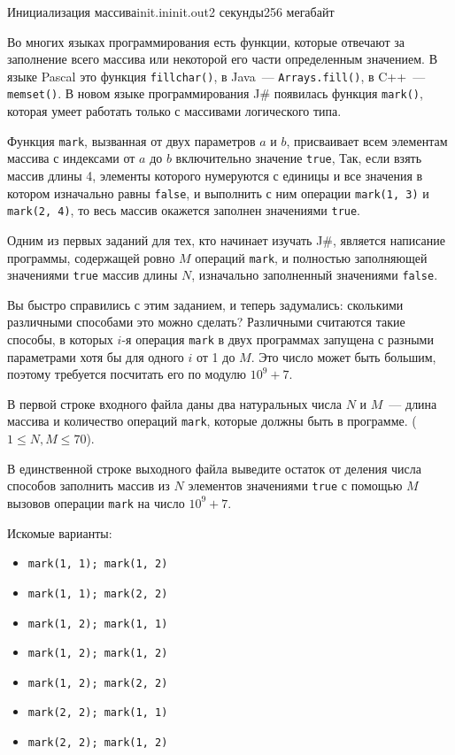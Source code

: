 \begin{problem}{Инициализация массива}{init.in}{init.out}{2 секунды}{256 мегабайт}


Во многих языках программирования есть функции, которые отвечают за заполнение всего массива или некоторой его части определенным значением. В языке 
Pascal это функция \texttt{fillchar()}, в Java~--- \texttt{Arrays.fill()}, 
в C++~--- \texttt{memset()}. В новом языке программирования J\# появилась функция \texttt{mark()}, 
которая умеет работать только с массивами логического типа.

Функция \texttt{mark}, вызванная от двух параметров $a$ и $b$, присваивает всем 
элементам массива с индексами от $a$ до $b$ включительно значение \texttt{true}, 
Так, если взять массив длины 4, элементы которого нумеруются с единицы и все значения в 
котором изначально равны \texttt{false}, и выполнить с ним операции 
\texttt{mark(1, 3)} и \texttt{mark(2, 4)}, то весь массив окажется заполнен значениями \texttt{true}.

Одним из первых заданий для тех, кто начинает изучать J\#, является написание программы, 
содержащей ровно $M$ операций \texttt{mark}, и полностью заполняющей 
значениями \texttt{true} массив длины  $N$, изначально заполненный значениями \texttt{false}. 

Вы быстро справились с этим заданием, и теперь задумались: сколькими 
различными способами это можно сделать? 
Различными считаются такие способы, в которых $i$-я операция \texttt{mark} в двух программах 
запущена с разными параметрами хотя бы для одного $i$ от 1 до $M$. Это число может 
быть большим, поэтому требуется посчитать его по модулю $10^9+7$.

\InputFile
В первой строке входного файла даны два натуральных числа $N$ и $M$~--- длина массива и количество 
операций \texttt{mark}, которые должны быть в программе.
($1 \le N, M \le 70$).

\OutputFile
В единственной строке выходного файла выведите остаток от деления числа способов заполнить
массив из $N$ элементов значениями \texttt{true} с помощью $M$ вызовов операции
\texttt{mark} на число $10^9+7$.

\Examples

\begin{example}%
%
\end{example}

\Note
Искомые варианты: 
\begin{itemize}
\item \texttt{mark(1, 1); mark(1, 2)} 
\item \texttt{mark(1, 1); mark(2, 2)} 
\item \texttt{mark(1, 2); mark(1, 1)} 
\item \texttt{mark(1, 2); mark(1, 2)} 
\item \texttt{mark(1, 2); mark(2, 2)} 
\item \texttt{mark(2, 2); mark(1, 1)} 
\item \texttt{mark(2, 2); mark(1, 2)} 
\end{itemize}

\end{problem}

